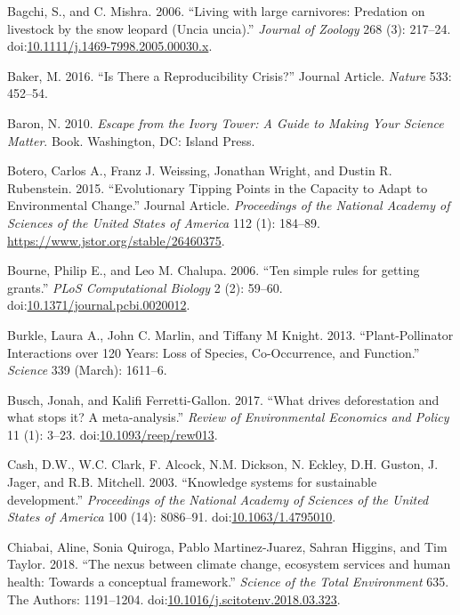 \documentclass[fleqn,10pt]{wlpeerj} %
\begin{document}
\hypertarget{ref-Bagchi2006}{}
Bagchi, S., and C. Mishra. 2006. ``Living with large carnivores:
Predation on livestock by the snow leopard (Uncia uncia).''
\emph{Journal of Zoology} 268 (3): 217--24.
doi:\href{https://doi.org/10.1111/j.1469-7998.2005.00030.x}{10.1111/j.1469-7998.2005.00030.x}.

\hypertarget{ref-Baker2016}{}
Baker, M. 2016. ``Is There a Reproducibility Crisis?'' Journal Article.
\emph{Nature} 533: 452--54.

\hypertarget{ref-Baron2010}{}
Baron, N. 2010. \emph{Escape from the Ivory Tower: A Guide to Making
Your Science Matter}. Book. Washington, DC: Island Press.

\hypertarget{ref-Botero2015}{}
Botero, Carlos A., Franz J. Weissing, Jonathan Wright, and Dustin R.
Rubenstein. 2015. ``Evolutionary Tipping Points in the Capacity to Adapt
to Environmental Change.'' Journal Article. \emph{Proceedings of the
National Academy of Sciences of the United States of America} 112 (1):
184--89. \url{https://www.jstor.org/stable/26460375}.

\hypertarget{ref-Bourne2006}{}
Bourne, Philip E., and Leo M. Chalupa. 2006. ``Ten simple rules for
getting grants.'' \emph{PLoS Computational Biology} 2 (2): 59--60.
doi:\href{https://doi.org/10.1371/journal.pcbi.0020012}{10.1371/journal.pcbi.0020012}.

\hypertarget{ref-Burkle2013}{}
Burkle, Laura A., John C. Marlin, and Tiffany M Knight. 2013.
``Plant-Pollinator Interactions over 120 Years: Loss of Species,
Co-Occurrence, and Function.'' \emph{Science} 339 (March): 1611--6.

\hypertarget{ref-Busch2017}{}
Busch, Jonah, and Kalifi Ferretti-Gallon. 2017. ``What drives
deforestation and what stops it? A meta-analysis.'' \emph{Review of
Environmental Economics and Policy} 11 (1): 3--23.
doi:\href{https://doi.org/10.1093/reep/rew013}{10.1093/reep/rew013}.

\hypertarget{ref-Cash2003}{}
Cash, D.W., W.C. Clark, F. Alcock, N.M. Dickson, N. Eckley, D.H. Guston,
J. Jager, and R.B. Mitchell. 2003. ``Knowledge systems for sustainable
development.'' \emph{Proceedings of the National Academy of Sciences of
the United States of America} 100 (14): 8086--91.
doi:\href{https://doi.org/10.1063/1.4795010}{10.1063/1.4795010}.

\hypertarget{ref-Chiabai2018}{}
Chiabai, Aline, Sonia Quiroga, Pablo Martinez-Juarez, Sahran Higgins,
and Tim Taylor. 2018. ``The nexus between climate change, ecosystem
services and human health: Towards a conceptual framework.''
\emph{Science of the Total Environment} 635. The Authors: 1191--1204.
doi:\href{https://doi.org/10.1016/j.scitotenv.2018.03.323}{10.1016/j.scitotenv.2018.03.323}.
\end{document}
